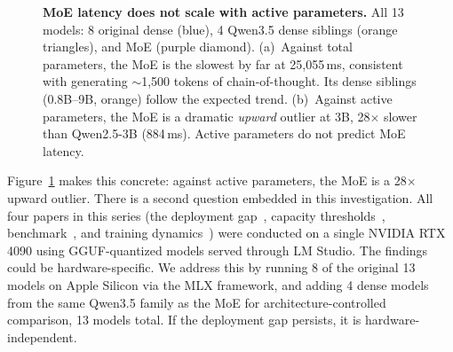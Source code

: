 \documentclass[11pt]{article}
\begin{document}
\begin{figure}[t]
\caption{\textbf{MoE latency does not scale with active parameters.} All 13 models: 8 original dense (blue), 4 Qwen3.5 dense siblings (orange triangles), and MoE (purple diamond). (a)~Against total parameters, the MoE is the slowest by far at 25,055\,ms, consistent with generating ${\sim}$1,500 tokens of chain-of-thought.  Its dense siblings (0.8B--9B, orange) follow the expected trend. (b)~Against active parameters, the MoE is a dramatic \emph{upward} outlier at 3B, 28$\times$ slower than Qwen2.5-3B (884\,ms).  Active parameters do not predict MoE latency.}
\label{fig:total-vs-active}
\end{figure}

Figure~\ref{fig:total-vs-active} makes this concrete: against active parameters, the MoE is a 28$\times$ upward outlier.  There is a second question embedded in this investigation.  All four papers in this series (the deployment gap~\citep{maloney2025deploymentgap}, capacity thresholds~\citep{maloney2025capacity}, benchmark~\citep{maloney2025agentslobench}, and training dynamics~\citep{maloney2025dynamics}) were conducted on a single NVIDIA RTX 4090 using GGUF-quantized models served through LM Studio.  The findings could be hardware-specific.  We address this by running 8 of the original 13 models on Apple Silicon via the MLX framework, and adding 4 dense models from the same Qwen3.5 family as the MoE for architecture-controlled comparison, 13 models total.  If the deployment gap persists, it is hardware-independent.
\end{document}
